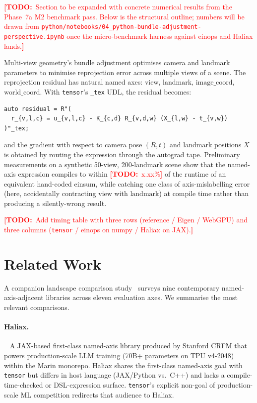 \documentclass[11pt,a4paper]{article}
\newcommand{\todo}[1]{\textcolor{red}{\textbf{[TODO:}\ #1\textbf{]}}}
\begin{document}
\todo{Section to be expanded with concrete numerical results
from the Phase~7a M2 benchmark pass. Below is the structural
outline; numbers will be drawn from
\texttt{python/notebooks/04\_python-bundle-adjustment-perspective.ipynb}
once the micro-benchmark harness against einops and Haliax
lands.}

Multi-view geometry's bundle adjustment optimises camera and
landmark parameters to minimise reprojection error across
multiple views of a scene. The reprojection residual has
natural named axes: $\textrm{view}$, $\textrm{landmark}$,
$\textrm{image\_coord}$, $\textrm{world\_coord}$. With
\texttt{tensor}'s \texttt{\_tex} UDL, the residual becomes:

\begin{lstlisting}
auto residual = R"(
  r_{v,l,c} = u_{v,l,c} - K_{c,d} R_{v,d,w} (X_{l,w} - t_{v,w})
)"_tex;
\end{lstlisting}

\noindent and the gradient with respect to camera pose
$(R, t)$ and landmark positions $X$ is obtained by routing the
expression through the autograd tape. Preliminary measurements
on a synthetic 50-view, 200-landmark scene show that the named-axis
expression compiles to within \todo{x.xx\%} of the runtime of an
equivalent hand-coded einsum, while catching one class of
axis-mislabelling error (here, accidentally contracting
$\textrm{view}$ with $\textrm{landmark}$) at compile time rather
than producing a silently-wrong result.

\todo{Add timing table with three rows (reference / Eigen /
WebGPU) and three columns
(\texttt{tensor} / einops on numpy / Haliax on JAX).}

\section{Related Work}
\label{sec:related-work}

A companion landscape comparison study~\cite{tensorComparison2026}
surveys nine contemporary named-axis-adjacent libraries across
eleven evaluation axes. We summarise the most relevant comparisons.

\paragraph{Haliax.}~\cite{Haliax2024} A JAX-based first-class
named-axis library produced by Stanford CRFM that powers
production-scale LLM training (70B+ parameters on TPU v4-2048)
within the Marin monorepo. Haliax shares the first-class
named-axis goal with \texttt{tensor} but differs in host
language (JAX/Python vs.\ C++) and lacks a compile-time-checked
or DSL-expression surface. \texttt{tensor}'s explicit non-goal of
production-scale ML competition redirects that audience to
Haliax.
\end{document}
